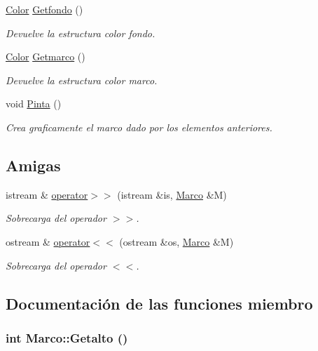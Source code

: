 \begin{CompactItemize}
\hyperlink{struct_color}{Color} \hyperlink{class_marco_b4d013f6b33c4c1ab7f8f91abd70a200}{Getfondo} ()
\begin{CompactList}\small\item\em Devuelve la estructura color fondo. \item\end{CompactList}\item 
\hyperlink{struct_color}{Color} \hyperlink{class_marco_2a8add5daf49790fdec1a6cc0013725f}{Getmarco} ()
\begin{CompactList}\small\item\em Devuelve la estructura color marco. \item\end{CompactList}\item 
void \hyperlink{class_marco_c22cd3f463bd42ee1f0ff005f1780251}{Pinta} ()
\begin{CompactList}\small\item\em Crea graficamente el marco dado por los elementos anteriores. \item\end{CompactList}\end{CompactItemize}
\subsection*{Amigas}
\begin{CompactItemize}
\item 
istream \& \hyperlink{class_marco_fab375685ea04cd0217fab909c6dedfb}{operator$>$$>$} (istream \&is, \hyperlink{class_marco}{Marco} \&M)
\begin{CompactList}\small\item\em Sobrecarga del operador $>$$>$. \item\end{CompactList}\item 
ostream \& \hyperlink{class_marco_b75f27bde4e8a09c753f27a59aaf2da0}{operator$<$$<$} (ostream \&os, \hyperlink{class_marco}{Marco} \&M)
\begin{CompactList}\small\item\em Sobrecarga del operador $<$$<$. \item\end{CompactList}\end{CompactItemize}


\subsection{Documentación de las funciones miembro}
\hypertarget{class_marco_f13fbd8bc2ea4555581c1c7739519184}{
\subsubsection[{Getalto}]{\setlength{\rightskip}{0pt plus 5cm}int Marco::Getalto ()}}
\label{class_marco_f13fbd8bc2ea4555581c1c7739519184}


